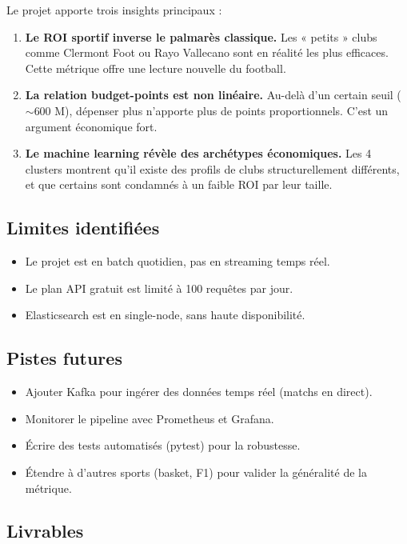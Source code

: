 \documentclass[11pt,a4paper]{article}
\begin{document}
Le projet apporte trois insights principaux :

\begin{enumerate}
  \item \textbf{Le ROI sportif inverse le palmarès classique.} Les « petits »
        clubs comme Clermont Foot ou Rayo Vallecano sont en réalité les plus
        efficaces. Cette métrique offre une lecture nouvelle du football.
  \item \textbf{La relation budget-points est non linéaire.} Au-delà d'un
        certain seuil ($\sim$600 M\texteuro), dépenser plus n'apporte plus de
        points proportionnels. C'est un argument économique fort.
  \item \textbf{Le machine learning révèle des archétypes économiques.} Les 4
        clusters montrent qu'il existe des profils de clubs structurellement
        différents, et que certains sont condamnés à un faible ROI par leur
        taille.
\end{enumerate}

\subsection*{Limites identifiées}

\begin{itemize}
  \item Le projet est en batch quotidien, pas en streaming temps réel.
  \item Le plan API gratuit est limité à 100 requêtes par jour.
  \item Elasticsearch est en single-node, sans haute disponibilité.
\end{itemize}

\subsection*{Pistes futures}

\begin{itemize}
  \item Ajouter Kafka pour ingérer des données temps réel (matchs en direct).
  \item Monitorer le pipeline avec Prometheus et Grafana.
  \item Écrire des tests automatisés (pytest) pour la robustesse.
  \item Étendre à d'autres sports (basket, F1) pour valider la généralité de la métrique.
\end{itemize}

\subsection*{Livrables}
\end{document}
